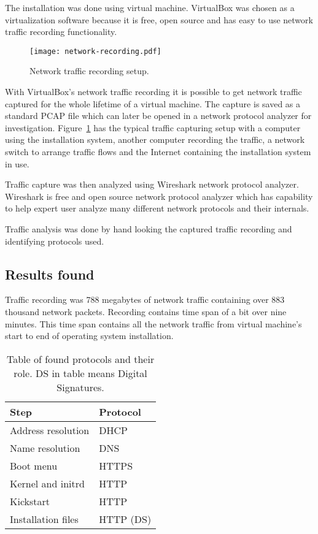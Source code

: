 The installation was done using virtual machine. VirtualBox was chosen
as a virtualization software because it is free, open source and has
easy to use network traffic recording functionality.

\begin{figure}[h]
  \caption{Network traffic recording setup.\label{fig:network-recording}}
  \texttt{[image: network-recording.pdf]}
\end{figure}

With VirtualBox's network traffic recording it is possible to get
network traffic captured for the whole lifetime of a virtual
machine. The capture is saved as a standard PCAP file which can later
be opened in a network protocol analyzer for
investigation. Figure~\ref{fig:network-recording} has the typical
traffic capturing setup with a computer using the installation system,
another computer recording the traffic, a network switch to arrange
traffic flows and the Internet containing the installation system in
use.

Traffic capture was then analyzed using Wireshark network protocol
analyzer. Wireshark is free and open source network protocol analyzer
which has capability to help expert user analyze many different
network protocols and their internals.

Traffic analysis was done by hand looking the captured traffic
recording and identifying protocols used.

\subsection{Results found}

Traffic recording was 788 megabytes of network traffic containing over
883 thousand network packets. Recording contains time span of a bit
over nine minutes. This time span contains all the network traffic
from virtual machine's start to end of operating system installation.

\begin{table}[!ht]
  \def\arraystretch{1.1}%
  \begin{center}
    \caption{Table of found protocols and their role. DS in table
      means Digital Signatures.\label{tab:found_protocols_table}}
    \begin{tabular}{| l | l |}
      \hline
      Step               & Protocol    \\
      \hline
      Address resolution & DHCP        \\
      Name resolution    & DNS         \\
      Boot menu          & HTTPS       \\
      Kernel and initrd  & HTTP        \\
      Kickstart          & HTTP        \\
      Installation files & HTTP (DS)   \\
      \hline
    \end{tabular}
  \end{center}
\end{table}

